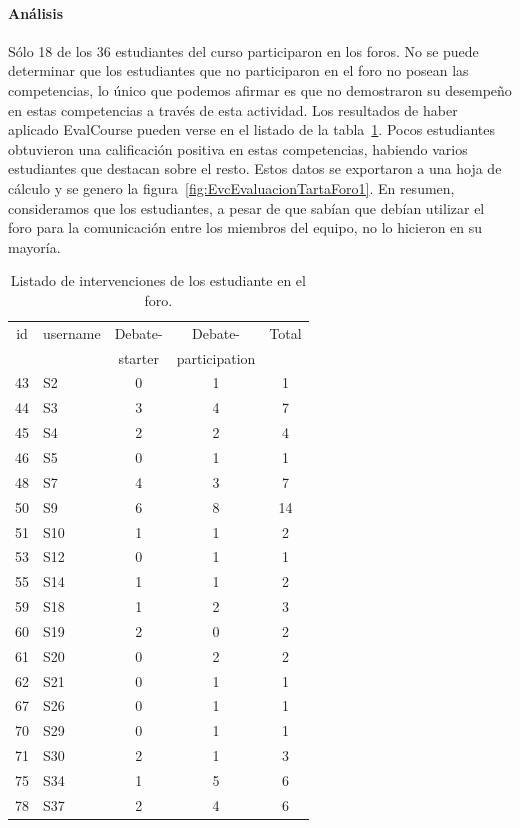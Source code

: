 \paragraph*{Análisis}

Sólo 18 de los 36 estudiantes del curso participaron en los foros. No se puede determinar que los estudiantes que no participaron en el foro no posean las competencias, lo único que podemos afirmar es que no demostraron su desempeño en estas competencias a través de esta actividad. Los resultados de haber aplicado EvalCourse pueden verse en el listado de la tabla~\ref{tab:EvcEvaluacionListadoForo1}. Pocos estudiantes obtuvieron una calificación positiva en estas competencias, habiendo varios estudiantes que destacan sobre el resto. Estos datos se exportaron a una hoja de cálculo y se genero la figura~\ref{fig:EvcEvaluacionTartaForo1}. En resumen, consideramos que los estudiantes, a pesar de que sabían que debían utilizar el foro para la comunicación entre los miembros del equipo, no lo hicieron en su mayoría.

\begin{table}
	\centering
	\caption{Listado de intervenciones de los estudiante en el foro.}
	\label{tab:EvcEvaluacionListadoForo1}
	\begin{tabular}{|c|l|c|c|c|}
		\hline
		id & username & Debate- & Debate- & Total  \\
			&		&	starter	& participation		&		\\
		\hline
		\hline
		43 &	S2 &	0 &	1 &	 1 \\
		44 &	S3 &	3 &	4 &	 7 \\
		45 &	S4 &	2 &	2 &	 4 \\
		46 &	S5 &	0 &	1 &	 1 \\
		48 &	S7 &	4 &	3 &	 7 \\
		50 &	S9 &	6 &	8 &	 14 \\
		51 &	S10 &	1 &	1 &	 2 \\
		53 &	S12 &	0 &	1 &	 1 \\
		55 &	S14 &	1 &	1 &	 2 \\
		59 &	S18 &	1 &	2 &	 3 \\
		60 &	S19 &	2 &	0 &	 2 \\
		61 &	S20 &	0 &	2 &	 2 \\
		62 &	S21 &	0 &	1 &	 1 \\
		67 &	S26 &	0 &	1 &	 1 \\
		70 &	S29 &	0 &	1 &	 1 \\
		71 &	S30 &	2 &	1 &	 3 \\
		75 &	S34 &	1 &	5 &	 6 \\
		78 &	S37 &	2 &	4 &	 6 \\
		\hline
	\end{tabular}
\end{table}

